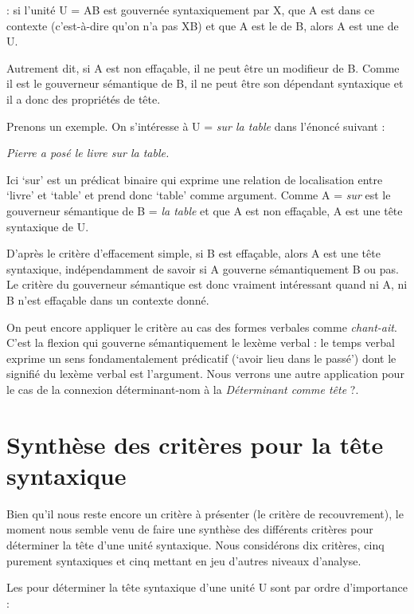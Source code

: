 {: si l’unité U = AB est gouvernée syntaxiquement par X, que A est  dans ce contexte (c'est-à-dire qu'on n'a pas XB)
et que A est le  de B, alors A est une  de U.}

Autrement dit, si A est non effaçable, il ne peut être un modifieur de B. Comme il est le gouverneur sémantique de B, il ne peut être son dépendant syntaxique et il a donc des propriétés de tête.

Prenons un exemple. On s’intéresse à U = \textit{sur la table} dans l’énoncé suivant :

\ea \textit{Pierre a posé le livre sur la table.}\z

Ici ‘sur’ est un prédicat binaire qui exprime une relation de localisation entre ‘livre’ et ‘table’ et prend donc ‘table’ comme argument. Comme A = \textit{sur} est le gouverneur sémantique de B = \textit{la table} et que A est non effaçable, A est une tête syntaxique de U.

D’après le critère d’effacement simple, si B est effaçable, alors A est une tête syntaxique, indépendamment de savoir si A gouverne sémantiquement B ou pas. Le critère du gouverneur sémantique est donc vraiment intéressant quand ni A, ni B n’est effaçable dans un contexte donné.

On peut encore appliquer le critère au cas des formes verbales comme \textit{chant-ait}. C’est la flexion qui gouverne sémantiquement le lexème verbal : le temps verbal exprime un sens fondamentalement prédicatif (‘avoir lieu dans le passé’) dont le signifié du lexème verbal est l’argument. Nous verrons une autre application pour le cas de la connexion déterminant-nom à la  \textit{Déterminant comme tête} ?.


\section{Synthèse des critères pour la tête syntaxique}\label{sec:3.3.20}

Bien qu’il nous reste encore un critère à présenter (le critère de recouvrement), le moment nous semble venu de faire une synthèse des différents critères pour déterminer la tête d’une unité syntaxique. Nous considérons dix critères, cinq purement syntaxiques et cinq mettant en jeu d’autres niveaux d’analyse.

Les  pour déterminer la tête syntaxique d’une unité U sont par ordre d’importance :

